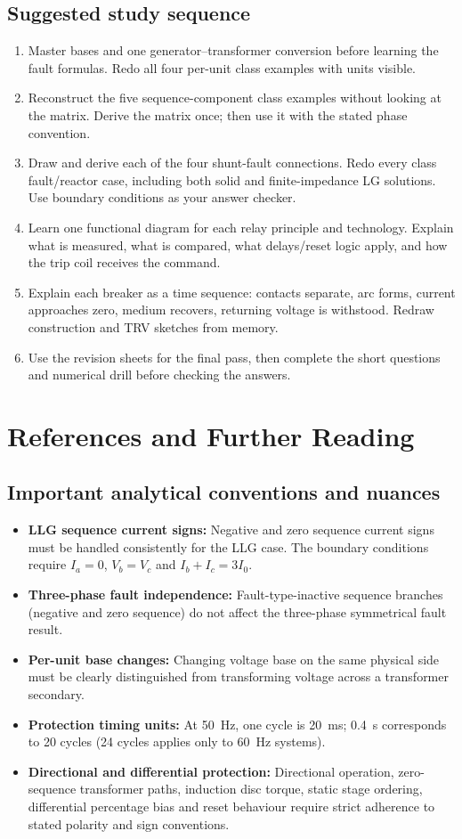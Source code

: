 \documentclass[11pt,a4paper]{article}
\newcommand{\chapterstart}[2]{\clearpage\section{#1}\label{#2}}
\begin{document}
\subsection{Suggested study sequence}
\begin{enumerate}
\item Master bases and one generator--transformer conversion before learning the fault formulas. Redo all four per-unit class examples with units visible.
\item Reconstruct the five sequence-component class examples without looking at the matrix. Derive the matrix once; then use it with the stated phase convention.
\item Draw and derive each of the four shunt-fault connections. Redo every class fault/reactor case, including both solid and finite-impedance LG solutions. Use boundary conditions as your answer checker.
\item Learn one functional diagram for each relay principle and technology. Explain what is measured, what is compared, what delays/reset logic apply, and how the trip coil receives the command.
\item Explain each breaker as a time sequence: contacts separate, arc forms, current approaches zero, medium recovers, returning voltage is withstood. Redraw construction and TRV sketches from memory.
\item Use the revision sheets for the final pass, then complete the short questions and numerical drill before checking the answers.
\end{enumerate}

\chapterstart{References and Further Reading}{coverage}
\subsection{Important analytical conventions and nuances}
\begin{itemize}
\item \textbf{LLG sequence current signs:} Negative and zero sequence current signs must be handled consistently for the LLG case. The boundary conditions require $I_a=0$, $V_b=V_c$ and $I_b+I_c=3I_0$.
\item \textbf{Three-phase fault independence:} Fault-type-inactive sequence branches (negative and zero sequence) do not affect the three-phase symmetrical fault result.
\item \textbf{Per-unit base changes:} Changing voltage base on the same physical side must be clearly distinguished from transforming voltage across a transformer secondary.
\item \textbf{Protection timing units:} At 50~Hz, one cycle is 20~ms; 0.4~s corresponds to 20 cycles (24 cycles applies only to 60~Hz systems).
\item \textbf{Directional and differential protection:} Directional operation, zero-sequence transformer paths, induction disc torque, static stage ordering, differential percentage bias and reset behaviour require strict adherence to stated polarity and sign conventions.
\end{itemize}
\end{document}
